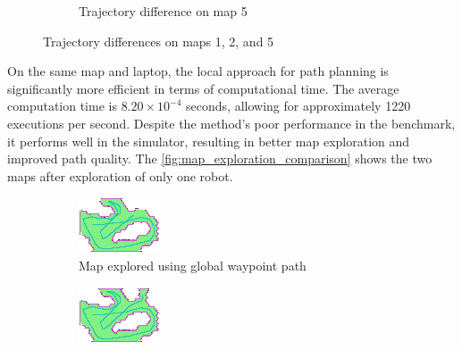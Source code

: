 \documentclass[../main.tex]{subfiles}
\begin{document}
\begin{figure}[H]
\begin{subfigure}[b]{0.45\textwidth}
		\caption{Trajectory difference on map 5}
		\label{fig:traj_diff_map5}
	\end{subfigure}
	\caption{Trajectory differences on maps 1, 2, and 5}
	\label{fig:traj_diff_maps}
\end{figure}

On the same map and laptop, the local approach for path planning is significantly more efficient in terms of computational time. The average computation time is $8.20 \times 10^{-4}$ seconds, allowing for approximately 1220 executions per second. Despite the method's poor performance in the benchmark, it performs well in the simulator, resulting in better map exploration and improved path quality. The \autoref{fig:map_exploration_comparison} shows the two maps after exploration of only one robot.

\begin{figure}[H]
	\centering
	\begin{subfigure}[b]{0.45\textwidth}
		\centering
		\includegraphics[width=\textwidth]{IMAGES/part3/map_explored_using_gwp.png}
		\caption{Map explored using global waypoint path}
		\label{fig:map_explored_using_gwp}
	\end{subfigure}
	\hfill
	\begin{subfigure}[b]{0.45\textwidth}
		\centering
		\includegraphics[width=\textwidth]{IMAGES/part3/map_explored_using_lwp.png}

\end{subfigure}
\end{figure}
\end{document}
